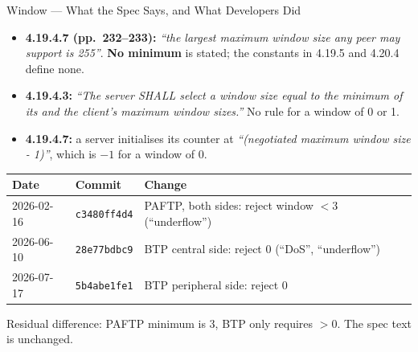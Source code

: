 \documentclass[10pt,aspectratio=169,t]{beamer}
\newcommand{\spec}[1]{\textcolor{blue!50!black}{\small\itshape #1}}
\begin{document}
\begin{frame}{Window --- What the Spec Says, and What Developers Did}
\small
\begin{itemize}
  \item \textbf{4.19.4.7 (pp.~232--233):} \spec{``the largest maximum window size
        any peer may support is 255''}. \textbf{No minimum} is stated; the
        constants in 4.19.5 and 4.20.4 define none.
  \item \textbf{4.19.4.3:} \spec{``The server SHALL select a window size equal
        to the minimum of its and the client's maximum window sizes.''} No rule
        for a window of 0 or 1.
  \item \textbf{4.19.4.7:} a server initialises its counter at
        \spec{``(negotiated maximum window size - 1)''}, which is $-1$ for a
        window of 0.
\end{itemize}
\vspace{2pt}
\begin{center}
\footnotesize
\begin{tabular}{lll}
\toprule
\textbf{Date} & \textbf{Commit} & \textbf{Change} \\
\midrule
2026-02-16 & \texttt{c3480ff4d4} & PAFTP, both sides: reject window $<3$ (``underflow'') \\
2026-06-10 & \texttt{28e77bdbc9} & BTP central side: reject 0 (``DoS'', ``underflow'') \\
2026-07-17 & \texttt{5b4abe1fe1} & BTP peripheral side: reject 0 \\
\bottomrule
\end{tabular}
\end{center}
\small Residual difference: PAFTP minimum is 3, BTP only requires $>0$. The spec
text is unchanged.
\end{frame}
\end{document}
